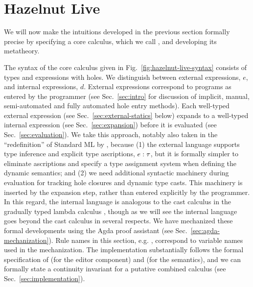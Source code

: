 \newcommand{\calculusSec}{Hazelnut Live}
\section{\protect\calculusSec}
\label{sec:calculus}





We will now make the intuitions developed in the previous section formally precise by specifying a core calculus, which we call \HazelnutLive, and developing its metatheory.

 The syntax of the core calculus given in Fig.~\ref{fig:hazelnut-live-syntax} consists of types and expressions with holes.
We distinguish between {external} expressions, $e$, and {internal} expressions, $d$.
External expressions correspond to programs as entered by the programmer
(see Sec.~\ref{sec:intro} for discussion of implicit, manual, semi-automated and fully automated hole entry methods).
Each well-typed external expression (see Sec.~\ref{sec:external-statics} below) expands to a well-typed internal expression (see Sec.~\ref{sec:expansion}) before it is evaluated (see Sec.~\ref{sec:evaluation}).
We take this approach, notably also taken in the ``redefinition'' of Standard ML by \citet{Harper00atype-theoretic}, because (1) the external language supports type inference and explicit type ascriptions, $e : \tau$, but it is formally simpler to eliminate ascriptions and specify a type assignment system when defining the dynamic semantics; and
(2) we need additional syntactic machinery during evaluation for tracking hole closures and dynamic type casts.
This machinery is inserted by the expansion step, rather than entered explicitly by the programmer.
In this regard, the internal language is analogous to the cast calculus in the gradually typed lambda calculus \cite{DBLP:conf/snapl/SiekVCB15,Siek06a}, though as we will see the \HazelnutLive internal language goes beyond the cast calculus in several respects. We have mechanized these formal developments using the Agda proof assistant \cite{norell:thesis,norell2009dependently}
(see Sec.~\ref{sec:agda-mechanization}). Rule names in this section, e.g. , correspond to variable names used in the mechanization. The \Hazel implementation substantially follows the formal specification of \Hazelnut (for the editor component) and \HazelnutLive (for the semantics), and we can formally state a continuity invariant for a putative combined calculus (see Sec.~\ref{sec:implementation}).

